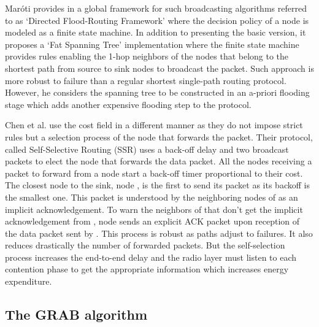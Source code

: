 \documentclass[journal, peerreview, onecolumn, draftcls]{IEEEtran}
\begin{document}
Mar\'oti provides in \cite{Maroti04} a global framework for such broadcasting algorithms referred to as `Directed Flood-Routing Framework' where the decision policy of a node is modeled as a finite state machine. In addition to presenting the basic version, it proposes a `Fat Spanning Tree' implementation where the finite state machine provides rules enabling the 1-hop neighbors of the nodes that belong to the shortest path from source to sink nodes to broadcast the packet. Such approach is more robust to failure than a regular shortest single-path routing protocol. However, he considers the spanning tree to be constructed in an a-priori flooding stage which adds another expensive flooding step to the protocol.

Chen et al. \cite{Chen05} use the cost field in a different manner as they do not impose strict rules but a selection process of the node that forwards the packet. Their protocol, called Self-Selective Routing (SSR) uses a back-off delay and two broadcast packets to elect the node that forwards the data packet. All the nodes receiving a packet to forward from a node  start a back-off timer proportional to their cost. The closest node to the sink, node , is the first to send its packet as its backoff is the smallest one. This packet is understood by the neighboring nodes of  as an implicit acknowledgement. To warn the neighbors of  that don't get the implicit acknowledgement from , node  sends an explicit ACK packet upon reception of the data packet sent by . This process is robust as paths adjust to failures. It also reduces drastically the number of forwarded packets. But the self-selection process increases the end-to-end delay and the radio layer must listen to each contention phase to get the appropriate information which increases energy expenditure.


\subsection{The GRAB algorithm}
\end{document}
